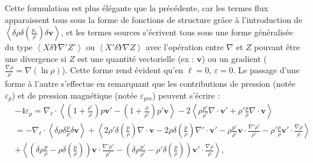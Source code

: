 Cette formulation  est plus élégante que la précédente, car les termes flux apparaissent tous sous la forme de fonctions de structure grâce à l'introduction de $\left<\delta \rho \delta \left(\frac{p_*}{\rho}\right) \delta \boldsymbol{v}\right>$, et les termes sources s'écrivent tous sous une forme généralisée du type $\left<X \delta Y \nabla' Z'\right>$ ou  $\left<X' \delta Y \nabla Z\right>$ avec l'opération entre $\nabla$ et $Z$ pouvant être une divergence si $Z$ est une quantité vectorielle (ex : $\boldsymbol{v}$) ou un gradient ($\frac{\nabla \rho}{\rho} = \nabla \left(\ln \rho\right)$). Cette forme rend évident qu'en $\boldsymbol{\ell} = 0$, $\varepsilon = 0$. Le passage d'une forme à l'autre s'effectue en remarquant que les contributions de pression (notée $\varepsilon_{p}$) et de pression magnétique (notée $\varepsilon_{pm}$) peuvent s'écrire : 
\begin{align}
\label{eq:turb_ref_p} &-4\varepsilon_{p}=\nabla_{\boldsymbol{\ell}} \cdot \left<\left(1+\frac{\rho'}{\rho}\right) p \boldsymbol{v'} - \left(1+\frac{\rho}{\rho'}\right)p'\boldsymbol{v} \right>  -2\left<\rho  \frac{p'}{\rho'} \nabla \cdot \boldsymbol{v'} + \rho' \frac{p}{\rho} \nabla \cdot \boldsymbol{v}\right> \nonumber\\
&= - \nabla_{\boldsymbol{\ell}} \cdot \left<\delta \rho  \delta \frac{p}{\rho} \delta \boldsymbol{v} \right>  +   \left<2  \rho' \delta \left(\frac{p}{\rho}\right) \nabla \cdot \boldsymbol{v} - 2  \rho \delta \left(\frac{p}{\rho}\right) \nabla' \cdot \boldsymbol{v'} -\rho \frac{p'}{\rho'} \boldsymbol{v} \cdot \frac{\nabla'\rho'}{\rho'} - \rho' \frac{p}{\rho} \boldsymbol{v'} \cdot \frac{\nabla\rho}{\rho} \right> \nonumber\\ 
&+ \left<\left(\delta \rho \frac{p}{\rho} - \rho \delta \left(\frac{p}{\rho}\right)\right)\boldsymbol{v} \cdot \frac{\nabla' \rho'}{\rho'} - \left(\delta \rho \frac{p'}{\rho'} - \rho' \delta \left(\frac{p}{\rho}\right)\right)\boldsymbol{v'} \cdot \frac{\nabla \rho}{\rho}\right>,
\end{align}

